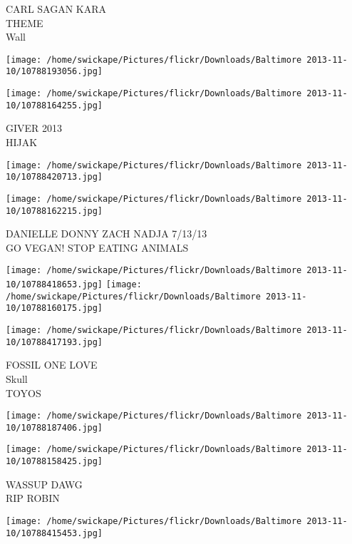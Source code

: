 \documentclass[10pt,letterpaper]{article}
\begin{document}
CARL SAGAN KARA\\
THEME\\
Wall\\
\pagebreak

\texttt{[image: /home/swickape/Pictures/flickr/Downloads/Baltimore 2013-11-10/10788193056.jpg]}

\vspace{0.25in}
\texttt{[image: /home/swickape/Pictures/flickr/Downloads/Baltimore 2013-11-10/10788164255.jpg]}

GIVER 2013\\
HIJAK\\
\pagebreak

\texttt{[image: /home/swickape/Pictures/flickr/Downloads/Baltimore 2013-11-10/10788420713.jpg]}

\vspace{0.25in}
\texttt{[image: /home/swickape/Pictures/flickr/Downloads/Baltimore 2013-11-10/10788162215.jpg]}

DANIELLE DONNY ZACH NADJA 7/13/13\\
GO VEGAN! STOP EATING ANIMALS\\
\pagebreak

\texttt{[image: /home/swickape/Pictures/flickr/Downloads/Baltimore 2013-11-10/10788418653.jpg]}
\texttt{[image: /home/swickape/Pictures/flickr/Downloads/Baltimore 2013-11-10/10788160175.jpg]}

\vspace{0.25in}
\texttt{[image: /home/swickape/Pictures/flickr/Downloads/Baltimore 2013-11-10/10788417193.jpg]}

FOSSIL ONE LOVE\\
Skull\\
TOYOS\\
\pagebreak

\texttt{[image: /home/swickape/Pictures/flickr/Downloads/Baltimore 2013-11-10/10788187406.jpg]}

\vspace{0.25in}
\texttt{[image: /home/swickape/Pictures/flickr/Downloads/Baltimore 2013-11-10/10788158425.jpg]}

WASSUP DAWG\\
RIP ROBIN\\
\pagebreak

\texttt{[image: /home/swickape/Pictures/flickr/Downloads/Baltimore 2013-11-10/10788415453.jpg]}
\end{document}
